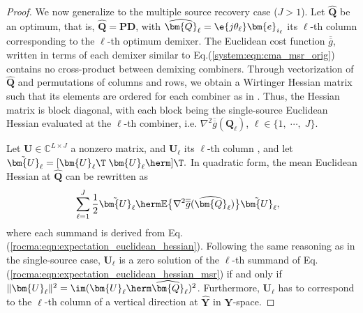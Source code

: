 \begin{proof}
	
	We now generalize to the multiple source recovery case ($J>1$). Let $\widehat{\bm{Q}}$ be an optimum, that is, $\widehat{\bm{Q}}=\bm{P}\bm{D}$, with $\widehat{\bm{Q}}_{\ell}=\e{j\theta_{\ell}}\bm{e}_{i_{\ell}}$ its $\ell$-th column corresponding to the $\ell$-th optimum demixer.
	The Euclidean cost function $\overline{\overline{g}}$, written in terms of each demixer similar to Eq.(\ref{system:eqn:cma_msr_orig})
	contains no cross-product between demixing combiners.
	Through vectorization of $\widehat{\bm{Q}}$ and permutations of columns and rows, we obtain a Wirtinger Hessian matrix such that its elements are ordered for each combiner as in \cite{Kreutz2008trustregionscma,Feres2019wfcma}.
	Thus, the Hessian matrix is block diagonal, with each block being the single-source Euclidean Hessian evaluated at the $\ell$-th combiner, i.e. $\nabla^2 \overline{\overline{g}}(\bm{Q}_{\ell})$, $\ell\in\{1,\;\cdots,\;J\}$.
	
	Let $\bm{U}\in\mathbb{C}^{L\times J}$ a nonzero matrix, and $\bm{U}_{\ell}$ its $\ell$-th column
	, and let $\tilde{\bm{U}}_{\ell}=[{\bm{U}}_{\ell}\T\;{\bm{U}}_{\ell}\herm]\T.$
	In quadratic form, the 
	mean Euclidean Hessian at $\widehat{\bm{Q}}$ can be rewritten as
	\begin{align}
		&\sum_{\ell=1}^J\frac{1}{2}
		\tilde{\bm{U}}_{\ell}
		\herm
		\mathbb{E}\big\{\nabla^2 \overline{\overline{g}}(\widehat{\bm{Q}}_{\ell})\big\}
		\tilde{\bm{U}}_{\ell}
		,	\label{rocma:eqn:expectation_euclidean_hessian_msr}
	\end{align}
	where each summand is derived from Eq.(\ref{rocma:eqn:expectation_euclidean_hessian}).
	Following the same reasoning as in the single-source case, $\bm{U}_{\ell}$ is a zero solution of the $\ell$-th summand of Eq.(\ref{rocma:eqn:expectation_euclidean_hessian_msr}) if and only if $\|\bm{U}_{\ell}\|^2=\im(\bm{U}_{\ell}\herm\widehat{\bm{Q}}_{\ell})^2$. Furthermore, $\bm{U}_{\ell}$ has to correspond to the $\ell$-th column of a vertical direction at $\widehat{\bm{Y}}$ in $\bm{Y}$-space.
	

\end{proof}
